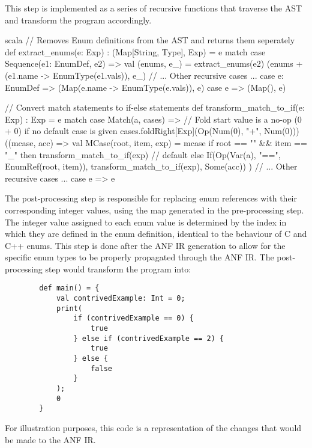 This step is implemented as a series of recursive functions that traverse the AST and transform the
program accordingly.

\begin{code}{scala}
    // Removes Enum definitions from the AST and returns them seperately
    def extract_enums(e: Exp) : (Map[String, Type], Exp) = e match {
        case Sequence(e1: EnumDef, e2) =>
            val (enums, e_) = extract_enums(e2)
            (enums + (e1.name -> EnumType(e1.vals)), e_)
        // ... Other recursive cases ...
        case e: EnumDef => (Map(e.name -> EnumType(e.vals)), e)
        case e => (Map(), e)
    }

    // Convert match statements to if-else statements
    def transform_match_to_if(e: Exp) : Exp = e match {
        case Match(a, cases) =>
            // Fold start value is a no-op (0 + 0) if no default case is given
            cases.foldRight[Exp](Op(Num(0), "+", Num(0)))((mcase, acc) => {
                val MCase(root, item, exp) = mcase
                if root == "" && item == "_" then
                    transform_match_to_if(exp)    // default
                else
                    If(Op(Var(a), "==", EnumRef(root, item)), transform_match_to_if(exp), Some(acc))
            })
        // ... Other recursive cases ...
        case e => e
    }
\end{code}

The post-processing step is responsible for replacing enum references with their corresponding
integer values, using the map generated in the pre-processing step. The integer value assigned to
each enum value is determined by the index in which they are defined in the enum definition,
identical to the behaviour of C and C++ enums. This step is done after the ANF IR generation to
allow for the specific enum types to be properly propagated through the ANF IR\@. The
post-processing step would transform the program into:

\begin{tcolorbox}
    \begin{verbatim}
        def main() = {
            val contrivedExample: Int = 0;
            print(
                if (contrivedExample == 0) {
                    true
                } else if (contrivedExample == 2) {
                    true
                } else {
                    false
                }
            );
            0
        }
    \end{verbatim}
    \tcblower
    \footnotesize
    For illustration purposes, this code is a representation of the changes that would be made to
    the ANF IR.
\end{tcolorbox}

